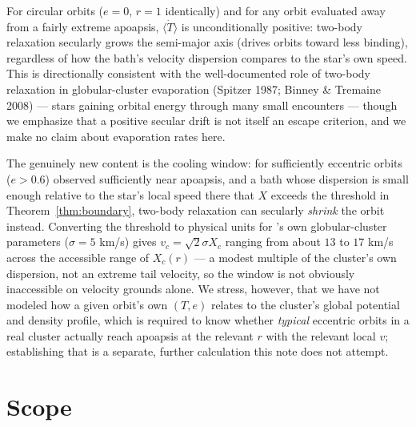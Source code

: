 \documentclass[12pt]{amsart}
\theoremstyle{plain}
\theoremstyle{remark}
\begin{document}
For circular orbits ($e=0$, $r=1$ identically) and for any orbit evaluated away from a fairly extreme apoapsis, $\langle\dot T\rangle$ is unconditionally positive: two-body relaxation secularly grows the semi-major axis (drives orbits toward less binding), regardless of how the bath's velocity dispersion compares to the star's own speed. This is directionally consistent with the well-documented role of two-body relaxation in globular-cluster evaporation (Spitzer 1987; Binney \& Tremaine 2008) --- stars gaining orbital energy through many small encounters --- though we emphasize that a positive secular drift is not itself an escape criterion, and we make no claim about evaporation rates here.

The genuinely new content is the cooling window: for sufficiently eccentric orbits ($e>0.6$) observed sufficiently near apoapsis, and a bath whose dispersion is small enough relative to the star's local speed there that $X$ exceeds the threshold in Theorem~\ref{thm:boundary}, two-body relaxation can secularly \emph{shrink} the orbit instead. Converting the threshold to physical units for \cite{Ebert2026Cluster}'s own globular-cluster parameters ($\sigma=5$ km/s) gives $v_c=\sqrt2\sigma X_c$ ranging from about $13$ to $17$ km/s across the accessible range of $X_c(r)$ --- a modest multiple of the cluster's own dispersion, not an extreme tail velocity, so the window is not obviously inaccessible on velocity grounds alone. We stress, however, that we have not modeled how a given orbit's own $(T,e)$ relates to the cluster's global potential and density profile, which is required to know whether \emph{typical} eccentric orbits in a real cluster actually reach apoapsis at the relevant $r$ with the relevant local $v$; establishing that is a separate, further calculation this note does not attempt.

\section{Scope}
\end{document}

